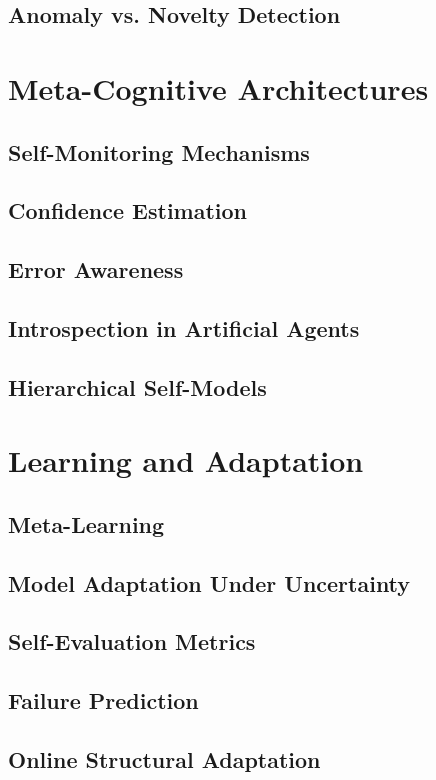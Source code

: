 \documentclass[a4paper]{article}
\begin{document}
	\subsection{Anomaly vs. Novelty Detection}

\section{Meta-Cognitive Architectures}

	\subsection{Self-Monitoring Mechanisms}
	\subsection{Confidence Estimation}
	\subsection{Error Awareness}
	\subsection{Introspection in Artificial Agents}
	\subsection{Hierarchical Self-Models}

\section{Learning and Adaptation}

	\subsection{Meta-Learning}
	\subsection{Model Adaptation Under Uncertainty}
	\subsection{Self-Evaluation Metrics}
	\subsection{Failure Prediction}
	\subsection{Online Structural Adaptation}
\end{document}
